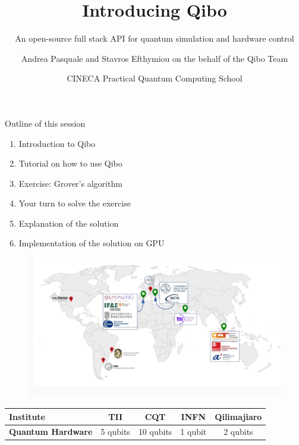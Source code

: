 \documentclass[11p,aspectratio=169]{beamer}
\title{Introducing Qibo}
\subtitle{An open-source full stack API for quantum simulation and hardware control}
\author{Andrea Pasquale and Stavros Efthymiou on the behalf of the Qibo Team}
\date{CINECA Practical Quantum Computing School}
\begin{document}
\maketitle

\begin{frame}{Outline of this session}
    \begin{enumerate}
        \item  Introduction to Qibo
        \item Tutorial on how to use Qibo
        \item Exercise: Grover's algorithm
        \item Your turn to solve the exercise
        \item Explanation of the solution
        \item Implementation of the solution on GPU
    \end{enumerate}
    
\end{frame}


\begin{frame}
    \begin{figure}
        \includegraphics[width=\textwidth]{figures/map.png}
    \end{figure}
        \begin{table}
            \centering
            \begin{tabular}{lcccc}
                \toprule
                \textbf{Institute} & TII & CQT & INFN & Qilimajiaro\\
                \midrule
                \textbf{Quantum Hardware} & 5 qubits & 10 qubits & 1 qubit & 2 qubits \\
                \bottomrule
            \end{tabular}
            \label{tab:qibo_versions}
            \end{table}
\end{frame}
\end{document}
